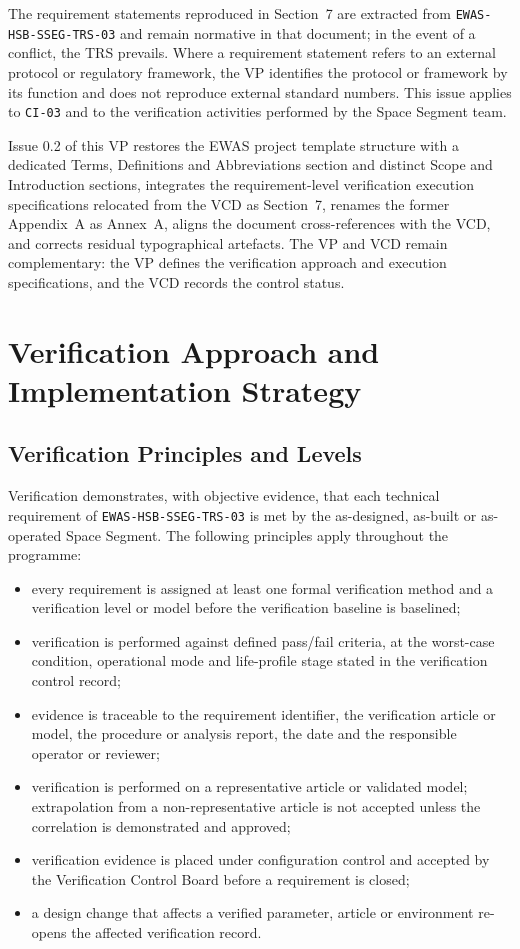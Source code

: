 The requirement statements reproduced in Section~7 are extracted from \texttt{EWAS-HSB-SSEG-TRS-03} and remain normative in that document; in the event of a conflict, the TRS prevails. Where a requirement statement refers to an external protocol or regulatory framework, the VP identifies the protocol or framework by its function and does not reproduce external standard numbers. This issue applies to \texttt{CI-03} and to the verification activities performed by the Space Segment team.

Issue 0.2 of this VP restores the EWAS project template structure with a dedicated Terms, Definitions and Abbreviations section and distinct Scope and Introduction sections, integrates the requirement-level verification execution specifications relocated from the VCD as Section~7, renames the former Appendix~A as Annex~A, aligns the document cross-references with the VCD, and corrects residual typographical artefacts. The VP and VCD remain complementary: the VP defines the verification approach and execution specifications, and the VCD records the control status.

\section{Verification Approach and Implementation Strategy}

\subsection{Verification Principles and Levels}

Verification demonstrates, with objective evidence, that each technical requirement of \texttt{EWAS-HSB-SSEG-TRS-03} is met by the as-designed, as-built or as-operated Space Segment. The following principles apply throughout the programme:
\begin{itemize}
    \item every requirement is assigned at least one formal verification method and a verification level or model before the verification baseline is baselined;
    \item verification is performed against defined pass/fail criteria, at the worst-case condition, operational mode and life-profile stage stated in the verification control record;
    \item evidence is traceable to the requirement identifier, the verification article or model, the procedure or analysis report, the date and the responsible operator or reviewer;
    \item verification is performed on a representative article or validated model; extrapolation from a non-representative article is not accepted unless the correlation is demonstrated and approved;
    \item verification evidence is placed under configuration control and accepted by the Verification Control Board before a requirement is closed;
    \item a design change that affects a verified parameter, article or environment re-opens the affected verification record.
\end{itemize}

